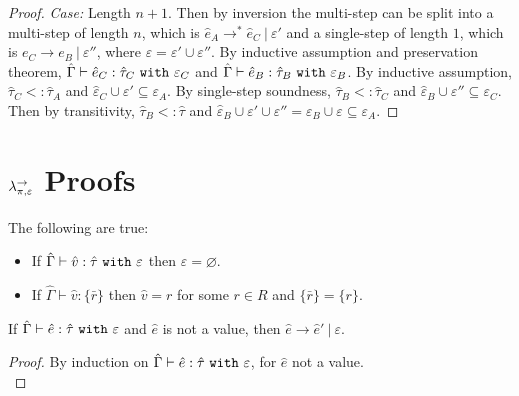 \begin{appendix}
\begin{proof}
\textit{Case:} Length $n+1$. Then by inversion the multi-step can be split into a multi-step of length $n$, which is $\hat e_A \longrightarrow^{*} \hat e_C~|~\varepsilon'$ and a single-step of length $1$, which is $e_C \longrightarrow e_B~|~\varepsilon''$, where $\varepsilon = \varepsilon' \cup \varepsilon''$. By inductive assumption and preservation theorem, $\hat \Gamma \vdash \hat e_C: \hat \tau_C~\mathtt{with}~ \varepsilon_C$ and $\hat \Gamma \vdash \hat e_B: \hat \tau_B~\mathtt{with}~ \varepsilon_B$. By inductive assumption, $\hat \tau_C <: \hat \tau_A$ and $\hat \varepsilon_C \cup \varepsilon' \subseteq \varepsilon_A$. By single-step soundness, $\hat \tau_B <: \hat \tau_C$ and $\hat \varepsilon_B \cup \varepsilon'' \subseteq \varepsilon_C$. Then by transitivity, $\hat \tau_B <: \hat \tau$ and $\hat \varepsilon_B \cup \varepsilon' \cup \varepsilon'' = \varepsilon_B \cup \varepsilon \subseteq \varepsilon_A$.
\end{proof}















\chapter{$\lambda^{\rightarrow}_{\pi, \varepsilon}$ Proofs}\label{appendix:LAS File}
\begin{lemma}
The following are true:
\begin{itemize}
	\setlength\itemsep{-0.7em}
	\item If $\hat \Gamma \vdash \hat v: \hat \tau~\mathtt{with}~ \varepsilon$ then $\varepsilon = \varnothing$.
	\item If $\hat \Gamma \vdash \hat v: \{ \bar r \}$ then $\hat v = r$ for some $r \in R$ and $\{ \bar r \} = \{ r \}$.
\end{itemize}
\end{lemma}

\hrulefill

\begin{theorem}[Progress]
If $\hat \Gamma \vdash \hat e: \hat \tau~\mathtt{with}~ \varepsilon$ and $\hat e$ is not a value, then $\hat e \longrightarrow \hat e'~|~\varepsilon$.
\end{theorem}

\begin{proof} By induction on $\hat \Gamma \vdash \hat e: \hat \tau~\mathtt{with}~ \varepsilon$, for $\hat e$ not a value.\\


\end{proof}
\end{appendix}
